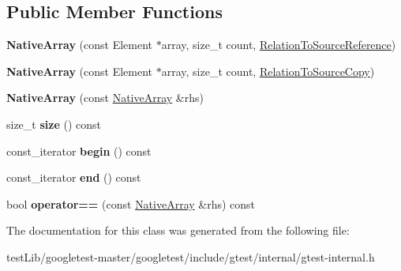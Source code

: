 \subsection*{Public Member Functions}
\begin{DoxyCompactItemize}
\item 
\mbox{\label{classtesting_1_1internal_1_1NativeArray_a52b3689c62532703d11e9d82939a7141}} 
{\bfseries Native\+Array} (const Element $\ast$array, size\+\_\+t count, \hyperlink{structtesting_1_1internal_1_1RelationToSourceReference}{Relation\+To\+Source\+Reference})
\item 
\mbox{\label{classtesting_1_1internal_1_1NativeArray_ac184ee5741af5be3402213819c834405}} 
{\bfseries Native\+Array} (const Element $\ast$array, size\+\_\+t count, \hyperlink{structtesting_1_1internal_1_1RelationToSourceCopy}{Relation\+To\+Source\+Copy})
\item 
\mbox{\label{classtesting_1_1internal_1_1NativeArray_abb346ac3040f5da733f594cc2d5958bc}} 
{\bfseries Native\+Array} (const \hyperlink{classtesting_1_1internal_1_1NativeArray}{Native\+Array} \&rhs)
\item 
\mbox{\label{classtesting_1_1internal_1_1NativeArray_af96a4a5ca0cdd5d163c47a081f08bd89}} 
size\+\_\+t {\bfseries size} () const
\item 
\mbox{\label{classtesting_1_1internal_1_1NativeArray_a3046d93cfa23097e7b7c91f5f982dc78}} 
const\+\_\+iterator {\bfseries begin} () const
\item 
\mbox{\label{classtesting_1_1internal_1_1NativeArray_ae1cda748e49c6906421c6183c4d07c5a}} 
const\+\_\+iterator {\bfseries end} () const
\item 
\mbox{\label{classtesting_1_1internal_1_1NativeArray_a81b90f5739ed812610e68dc34c9e3850}} 
bool {\bfseries operator==} (const \hyperlink{classtesting_1_1internal_1_1NativeArray}{Native\+Array} \&rhs) const
\end{DoxyCompactItemize}


The documentation for this class was generated from the following file\+:\begin{DoxyCompactItemize}
\item 
test\+Lib/googletest-\/master/googletest/include/gtest/internal/gtest-\/internal.\+h\end{DoxyCompactItemize}
